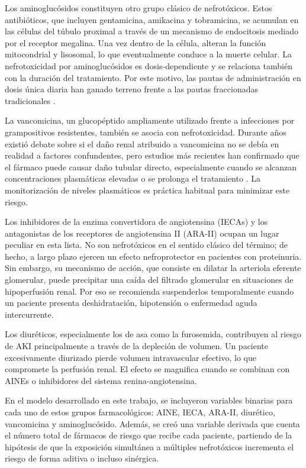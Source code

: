 \documentclass[12pt, a4paper, oneside]{report}
\begin{document}
Los aminoglucósidos constituyen otro grupo clásico de nefrotóxicos. Estos antibióticos, que incluyen gentamicina, amikacina y tobramicina, se acumulan en las células del túbulo proximal a través de un mecanismo de endocitosis mediado por el receptor megalina. Una vez dentro de la célula, alteran la función mitocondrial y lisosomal, lo que eventualmente conduce a la muerte celular. La nefrotoxicidad por aminoglucósidos es dosis-dependiente y se relaciona también con la duración del tratamiento. Por este motivo, las pautas de administración en dosis única diaria han ganado terreno frente a las pautas fraccionadas tradicionales \parencite{perazella2022drugaki}.

La vancomicina, un glucopéptido ampliamente utilizado frente a infecciones por grampositivos resistentes, también se asocia con nefrotoxicidad. Durante años existió debate sobre si el daño renal atribuido a vancomicina no se debía en realidad a factores confundentes, pero estudios más recientes han confirmado que el fármaco puede causar daño tubular directo, especialmente cuando se alcanzan concentraciones plasmáticas elevadas o se prolonga el tratamiento \parencite{pais2020vancomycin}. La monitorización de niveles plasmáticos es práctica habitual para minimizar este riesgo.

Los inhibidores de la enzima convertidora de angiotensina (IECAs) y los antagonistas de los receptores de angiotensina II (ARA-II) ocupan un lugar peculiar en esta lista. No son nefrotóxicos en el sentido clásico del término; de hecho, a largo plazo ejercen un efecto nefroprotector en pacientes con proteinuria. Sin embargo, su mecanismo de acción, que consiste en dilatar la arteriola eferente glomerular, puede precipitar una caída del filtrado glomerular en situaciones de hipoperfusión renal. Por eso se recomienda suspenderlos temporalmente cuando un paciente presenta deshidratación, hipotensión o enfermedad aguda intercurrente.

Los diuréticos, especialmente los de asa como la furosemida, contribuyen al riesgo de AKI principalmente a través de la depleción de volumen. Un paciente excesivamente diurizado pierde volumen intravascular efectivo, lo que compromete la perfusión renal. El efecto se magnifica cuando se combinan con AINEs o inhibidores del sistema renina-angiotensina.

En el modelo desarrollado en este trabajo, se incluyeron variables binarias para cada uno de estos grupos farmacológicos: AINE, IECA, ARA-II, diurético, vancomicina y aminoglucósido. Además, se creó una variable derivada que cuenta el número total de fármacos de riesgo que recibe cada paciente, partiendo de la hipótesis de que la exposición simultánea a múltiples nefrotóxicos incrementa el riesgo de forma aditiva o incluso sinérgica.
\end{document}
